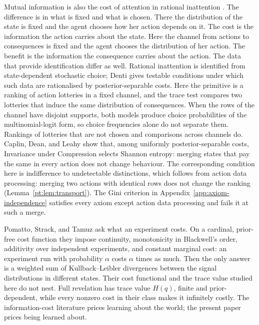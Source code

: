 \documentclass[11pt,a4paper]{article}
\theoremstyle{definition}
\newcommand{\Sh}{H}
\newcommand{\1}{\mathbf 1}
\begin{document}
Mutual information is also the cost of attention in rational inattention \cite{Sims2003,MatejkaMcKay2015}. The difference is in what is fixed and what is chosen. There the distribution of the state is fixed and the agent chooses how her action depends on it. The cost is the information the action carries about the state.  Here the channel from actions to consequences is fixed and the agent chooses the distribution of her action. The benefit is the information the consequence carries about
the action. The data that provide identification differ as
well.  Rational inattention is identified from state-dependent stochastic choice; Denti \cite{Denti2022} gives
testable conditions under which such data are rationalised by posterior-separable costs.  Here the primitive
is a ranking of action lotteries in a fixed channel, and the trace test compares two lotteries that induce the
same distribution of consequences.  When the rows of the channel have disjoint supports, both models produce
choice probabilities of the multinomial-logit form, so choice frequencies alone do not separate them.
Rankings of lotteries that are not chosen and comparisons across channels do.  Caplin, Dean, and Leahy
\cite{CaplinDeanLeahy2022} show that, among uniformly posterior-separable costs, Invariance under Compression
selects Shannon entropy: merging states that pay the same in every action does not change behaviour.  The
corresponding condition here is indifference to undetectable distinctions, which follows from action data
processing: merging two actions with identical rows does not change the ranking
(Lemma~\ref{pt:lem:transport}).  The Gini criterion in Appendix~\ref{app:axiom-independence} satisfies every
axiom except action data processing and fails it at such a merge.

Pomatto, Strack, and Tamuz \cite{PomattoStrackTamuz2023} ask what an experiment costs.  On a cardinal,
prior-free cost function they impose continuity, monotonicity in Blackwell's order, additivity over
independent experiments, and constant marginal cost: an experiment run with probability $\alpha$ costs
$\alpha$ times as much.  Then the only answer is a weighted sum of Kullback--Leibler divergences
between the signal distributions in different states.
Their cost functional and the trace value studied here do not nest.
Full revelation has trace value $\Sh(q)$, finite and prior-dependent, while every nonzero cost in their class
makes it infinitely costly.  The information-cost literature prices
learning about the world; the present paper prices being learned about.
\end{document}
